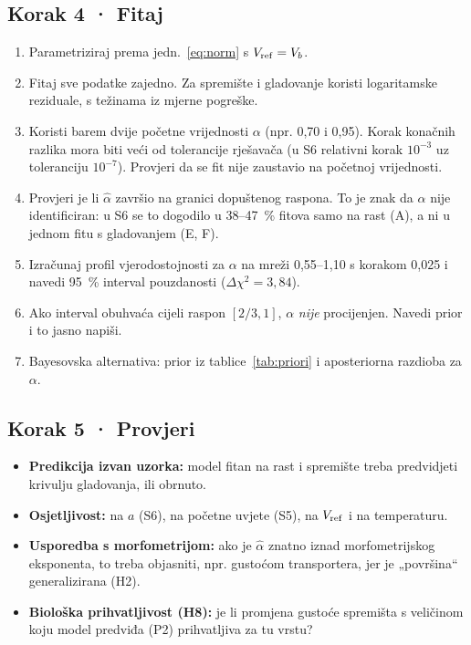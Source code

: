 \subsection*{Korak 4 · Fitaj}
\begin{enumerate}[leftmargin=1.6em]
\item Parametriziraj prema jedn.~\eqref{eq:norm} s $V_{\mathrm{ref}}=V_b$.
\item Fitaj sve podatke zajedno. Za spremište i gladovanje koristi logaritamske reziduale, s težinama iz mjerne pogreške.
\item Koristi barem dvije početne vrijednosti $\alpha$ (npr. 0,70 i 0,95). Korak konačnih razlika mora biti veći od tolerancije rješavača (u S6 relativni korak $10^{-3}$ uz toleranciju $10^{-7}$). Provjeri da se fit nije zaustavio na početnoj vrijednosti.
\item Provjeri je li $\hat\alpha$ završio na granici dopuštenog raspona. To je znak da $\alpha$ nije identificiran: u S6 se to dogodilo u 38–47~\% fitova samo na rast (A), a ni u jednom fitu s gladovanjem (E, F).
\item Izračunaj profil vjerodostojnosti za $\alpha$ na mreži 0,55–1,10 s korakom 0,025 i navedi 95~\% interval pouzdanosti ($\Delta\chi^2=3{,}84$).
\item Ako interval obuhvaća cijeli raspon $[2/3,1]$, $\alpha$ \emph{nije} procijenjen. Navedi prior i to jasno napiši.
\item Bayesovska alternativa: prior iz tablice~\ref{tab:priori} i aposteriorna razdioba za $\alpha$.
\end{enumerate}

\subsection*{Korak 5 · Provjeri}
\begin{itemize}
\item \textbf{Predikcija izvan uzorka:} model fitan na rast i spremište treba predvidjeti krivulju gladovanja, ili obrnuto.
\item \textbf{Osjetljivost:} na $a$ (S6), na početne uvjete (S5), na $V_{\mathrm{ref}}$ i na temperaturu.
\item \textbf{Usporedba s morfometrijom:} ako je $\hat\alpha$ znatno iznad morfometrijskog eksponenta, to treba objasniti, npr. gustoćom transportera, jer je „površina“ generalizirana (H2).
\item \textbf{Biološka prihvatljivost (H8):} je li promjena gustoće spremišta s veličinom koju model predviđa (P2) prihvatljiva za tu vrstu?
\end{itemize}

